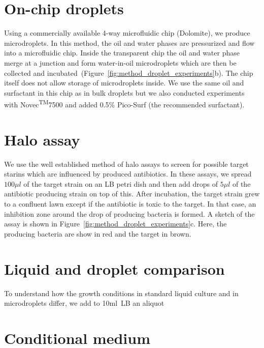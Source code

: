 \section{On-chip droplets}
Using a commercially available 4-way microfluidic chip (Dolomite), we produce microdroplets. In this method, the oil and water phases are pressurized and flow into a microfluidic chip. Inside the transparent chip the oil and water phase merge at a junction and form water-in-oil microdroplets which are then be collected and incubated~(Figure~\ref{fig:method_droplet_experiments}b). The chip itself does not allow storage of microdroplets inside. We use the same oil and surfactant in this chip as in bulk droplets but we also conducted experiments with Novec\textsuperscript{TM}7500 and added 0.5\% Pico-Surf{\textregistered} (the recommended surfactant).

\section{Halo assay}
We use the well established method of halo assays to screen for possible target starins which are influenced by produced antibiotics. In these assays, we spread $100\mu l$ of the target strain on an LB petri dish and then add drops of $5\mu l$ of the antibiotic producing strain on top of this. After incubation, the target strain grew to a confluent lawn except if the antibiotic is toxic to the target. In that case, an inhibition zone around the drop of producing bacteria is formed. A sketch of the assay is shown in Figure~\ref{fig:method_droplet_experiments}c. Here, the producing bacteria are show in red and the target in brown.  

\section{Liquid and droplet comparison}
To understand how the growth conditions in standard liquid culture and in microdroplets differ, we add to 10ml~\gls{LB} an aliquot  

\section{Conditional medium}